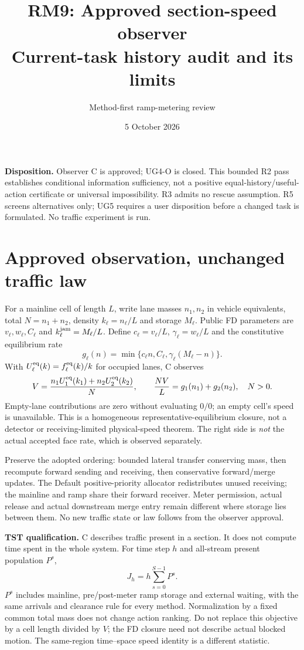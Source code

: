 \documentclass[10pt,a4paper]{article}
\title{RM9: Approved section-speed observer\\Current-task history audit and its limits}
\author{Method-first ramp-metering review}
\date{5 October 2026}
\begin{document}
\maketitle
\textbf{Disposition.} Observer C is approved; UG4-O is closed. This bounded R2
pass establishes conditional information sufficiency, not a positive
equal-history/useful-action certificate or universal impossibility. R3 admits
no rescue assumption. R5 screens alternatives only; UG5 requires a user
disposition before a changed task is formulated. No traffic experiment is run.

\section{Approved observation, unchanged traffic law}
For a mainline cell of length $L$, write lane masses $n_1,n_2$ in vehicle
equivalents, total $N=n_1+n_2$, density $k_\ell=n_\ell/L$ and storage $M_\ell$.
Public FD parameters are $v_\ell,w_\ell,C_\ell$ and
$k^{\rm jam}_\ell=M_\ell/L$. Define $c_\ell=v_\ell/L$,
$\gamma_\ell=w_\ell/L$ and the constitutive equilibrium rate
\begin{equation}
g_\ell(n)=\min\{c_\ell n,C_\ell,\gamma_\ell(M_\ell-n)\}.
\end{equation}
With $U^{\rm eq}_\ell(k)=f^{\rm eq}_\ell(k)/k$ for occupied lanes, C observes
\begin{equation}
V=\frac{n_1U^{\rm eq}_1(k_1)+n_2U^{\rm eq}_2(k_2)}{N},\qquad
\frac{NV}{L}=g_1(n_1)+g_2(n_2),\quad N>0.
\label{eq:c}
\end{equation}
Empty-lane contributions are zero without evaluating $0/0$; an empty cell's
speed is unavailable. This is a homogeneous representative-equilibrium closure,
not a detector or receiving-limited physical-speed theorem. The right side is
\emph{not} the actual accepted face rate, which is observed separately.

Preserve the adopted ordering: bounded lateral transfer conserving mass, then
recompute forward sending and receiving, then conservative forward/merge updates.
The Default positive-priority allocator redistributes unused receiving; the
mainline and ramp share their forward receiver. Meter permission, actual
release and actual downstream merge entry remain different where storage lies
between them. No new traffic state or law follows from the observer approval.

\textbf{TST qualification.} C describes traffic present in a section. It does
not compute time spent in the whole system. For time step $h$ and all-stream
present population $P^s$,
\begin{equation}
J_h=h\sum_{s=0}^{S-1}P^s.
\end{equation}
$P^s$ includes mainline, pre/post-meter ramp storage and external waiting, with
the same arrivals and clearance rule for every method. Normalization by a fixed
common total mass does not change action ranking. Do not replace this objective
by a cell length divided by $V$; the FD closure need not describe actual blocked
motion. The same-region time--space speed identity is a different statistic.
\newpage
\end{document}
